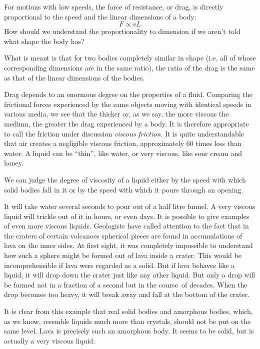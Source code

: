 For motions with low speeds, the force of resistance, or drag, is directly proportional to the speed and the linear dimensions of a body:
\begin{equation*}%
F \propto vL
\end{equation*}
How should we understand the proportionality to dimension if we aren’t told what shape the body has?

What is meant is that for two bodies completely similar in shape (i.e. all of whose corresponding dimensions are in the same ratio), the ratio of the drag is the same as that of the linear dimensions of the bodies.

Drag depends to an enormous degree on the properties of a fluid. Comparing the frictional forces experienced by the same objects moving with identical speeds in various media, we see that the thicker or, as we say, the more viscous the medium, the greater the drag experienced by a body. It is therefore appropriate to call the friction under discussion \emph{viscous friction}. It is quite understandable that air creates a negligible viscous friction, approx­imately 60 times less than water. A liquid can be ``thin'', like water, or very viscous, like sour cream and honey.

We can judge the degree of viscosity of a liquid either by the speed with which solid bodies fall in it or by the speed with which it pours through an opening.

It will take water several seconds to pour out of a half­ litre funnel. A very viscous liquid will trickle out of it in hours, or even days. It is possible to give examples of even more viscous liquids. Geologists have called atten­tion to the fact that in the craters of certain volcanoes spherical pieces are found in accumulations of lava on the inner sides. At first sight, it was completely impossible to understand how such a sphere might be formed out of lava inside a crater. This would be incomprehensible if lava were regarded as a solid. But if lava behaves like a liquid, it will drop down the crater just like any other liquid. But only a drop will be formed not in a fraction of a second but in the course~of decades. When the drop becomes too heavy, it will break away and fall at the bottom of the crater.

It is clear from this example that real solid bodies and amorphous bodies, which, as we know, resemble liquids much more than crystals, should not be put on the same level. Lava is precisely such an amorphous body. It seems
to be solid, but is actually a very viscous liquid.

